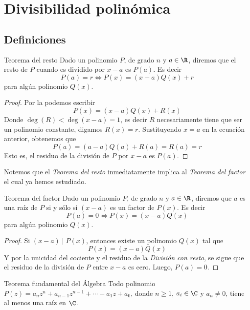 \newpage
\section{Divisibilidad polinómica}


\subsection{Definiciones}

\begin{section-theorem.tcb}{Teorema del resto}{}
    Dado un polinomio $P$, de grado $n$ y $a \in \R$, diremos que el resto de $P$ cuando es dividido por $x - a$ es $P(a)$.
    Es decir
    \[P(a)   = r \Leftrightarrow P(x) = (x-a)Q(x) + r\]
    para algún polinomio $Q(x).$
\end{section-theorem.tcb}
\begin{proof}
    Por la  podemos escribir
    \[P(x) = (x-a)Q(x) + R(x)\]
    Donde $\deg (R) < \deg(x - a) = 1$, es decir $R$ necesariamente tiene que ser un polinomio constante, digamos $R(x) = r$.
    Sustituyendo $x = a$ en la ecuación anterior, obtenemos que
    \[P(a) = (a - a)Q(a) + R(a) = R(a) = r\]
    Esto es, el residuo de la división de $P$ por $x - a$ es $P(a)$.
\end{proof}

Notemos que el \textit{Teorema del resto} inmediatamente implica al \textit{Teorema del factor} el cual ya hemos estudiado.

\begin{section-theorem.tcb}{Teorema del factor}{}
    Dado un polinomio $P$, de grado $n$ y $a \in \R$, diremos que $a$ es una raíz de $P$ si y sólo si $(x-a)$ es un factor de $P(x)$.
    Es decir
    \[P(a) = 0 \Leftrightarrow P(x) = (x-a)Q(x)\]
    para algún polinomio $Q(x).$
\end{section-theorem.tcb}

\begin{proof}
    Si $(x - a) \mid P(x)$, entonces existe un polinomio $Q(x)$ tal que
    \[P(x) = (x-a)Q(x)\]
    Y por la unicidad del cociente y el residuo de la \textit{División con resto}, se sigue que el residuo de la división de $P$ entre $x - a$ es cero.
    Luego, $P(a) = 0$.
\end{proof}

\begin{section-theorem.tcb}{Teorema fundamental del Álgebra}{}
    Todo polinomio $P(z) = a_n z^n + a_{n - 1} z^{n - 1} + \cdots + a_1 z + a_0$, donde $n \geq 1$, $a_i \in \C$ y $a_n \neq 0$, tiene al menos una raíz en $\C$.
\end{section-theorem.tcb}

